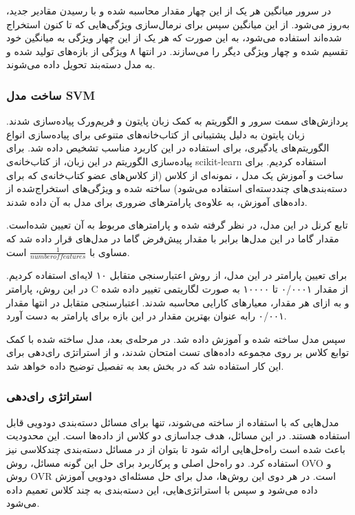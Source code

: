 	در سرور میانگین هر یک از این چهار مقدار محاسبه شده و با رسیدن مقادیر جدید، به‌روز می‌شود. از این میانگین سپس برای نرمال‌سازی ویژگی‌هایی که تا کنون استخراج شده‌اند استفاده می‌شود، به این صورت که هر یک از این چهار ویژگی به میانگین خود تقسیم شده و چهار ویژگی دیگر را می‌سازند. در انتها ۸ ویژگی از بازه‌های  تولید شده و به مدل دسته‌بند تحویل داده می‌شوند.

		
		\subsubsection{ساخت مدل SVM}
پردازش‌های سمت سرور و الگوریتم  به کمک زبان پایتون و فریم‌ورک  پیاده‌سازی شدند. زبان پایتون به دلیل پشتیبانی از کتاب‌خانه‌های متنوعی برای پیاده‌سازی انواع الگوریتم‌های یادگیری، برای استفاده در این کاربرد مناسب تشخیص داده شد. برای پیاده‌سازی الگوریتم  در این زبان، از کتاب‌خانه‌ی scikit-learn استفاده کردیم. برای ساخت و آموزش یک مدل ، نمونه‌ای از کلاس  (از کلاس‌های عضو کتاب‌خانه‌ی  که برای دسته‌بندی‌های چنددسته‌ای استفاده می‌شود) ساخته شده و ویژگی‌های استخراج‌شده از داده‌های آموزش، به علاوه‌ی پارامترهای ضروری برای مدل  به آن داده شدند. 

	تابع کرنل در این مدل،  در نظر گرفته شده و پارامترهای مربوط به آن تعیین شده‌است. مقدار گاما در این مدل‌ها برابر با مقدار پیش‌فرض گاما در مدل‌های  قرار داده شد که مساوی با $\frac{1}{number of features}$ است.
	
برای تعیین پارامتر  در این مدل، از روش اعتبارسنجی متقابل ۱۰ لایه‌ای استفاده کردیم. در این روش، پارامتر C از مقدار ۰/۰۰۰۱ تا ۱۰۰۰۰ به صورت لگاریتمی تغییر داده شده و به ازای هر مقدار، معیارهای کارایی محاسبه شدند. اعتبارسنجی متقابل در انتها مقدار ۰/۰۰۱ رابه عنوان بهترین مقدار در این بازه برای پارامتر  به دست آورد.
 
سپس مدل ساخته شده و آموزش داده شد. در مرحله‌ی بعد، مدل ساخته شده با کمک توابع کلاس  بر روی مجموعه‌ داده‌های تست امتحان شدند، و از استراتژی رای‌دهی  برای این کار استفاده شد که در بخش بعد به تفصیل توضیح داده خواهد شد.
	
		\subsubsection{استراتژی رای‌دهی}
		مدل‌هایی که با استفاده از  ساخته می‌شوند، تنها برای مسائل دسته‌بندی دودویی قابل استفاده هستند. در این مسائل، هدف جداسازی دو کلاس از داده‌ها است. این محدودیت باعث شده است راه‌حل‌هایی ارائه شود تا بتوان از  در مسائل دسته‌بندی چندکلاسی نیز استفاده کرد. دو راه‌حل اصلی و پرکاربرد برای حل این گونه مسائل، روش OVO و روش OVR است. در هر دوی این روش‌ها، مدل  برای حل مسئله‌ای دودویی آموزش داده می‌شود و سپس با استراتژی‌هایی،‌ این دسته‌بندی به چند کلاس تعمیم داده می‌شود.
		 
